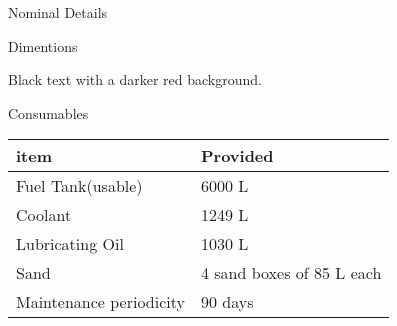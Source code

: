 \documentclass[
  ignorenonframetext,
]{beamer}
\begin{document}
\begin{frame}{Nominal Details}
\begin{block}{Dimentions}
\begin{shaded}
Black text with a darker red background.

\end{shaded}
\end{block}

\begin{block}{Consumables}
\protect\hypertarget{consumables}{}
\begin{longtable}[]{@{}ll@{}}
\toprule()
item & Provided \\
\midrule()
\endhead
Fuel Tank(usable) & 6000 L \\
Coolant & 1249 L \\
Lubricating Oil & 1030 L \\
Sand & 4 sand boxes of 85 L each \\
Maintenance periodicity & 90 days \\
\bottomrule()
\end{longtable}
\end{block}
\end{frame}
\end{document}
